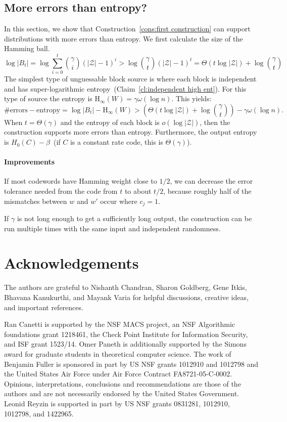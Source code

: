 \documentclass[11pt]{article}
\newcommand{\clref}[1]{\mbox{Claim~\ref{#1}}}
\newcommand{\consref}[1]{\mbox{Construction~\ref{#1}}}
\newcommand{\Hoo}{\mathrm{H}_\infty}
\newcommand{\blind}[1]{{#1}}
\newcommand{\blind}[1]{}
\begin{document}
\subsection{More errors than entropy?}
\label{sec:discussion}
In this section, we show that \consref{cons:first construction} can support distributions with more errors than entropy.
We first calculate the size of the Hamming ball.
\[
\log |B_t| = \log \sum_{i=0}^t {\gamma \choose i} (|\mathcal{Z}|-1)^i> \log {\gamma \choose t} (|\mathcal{Z}|-1)^t =\Theta(t\log |\mathcal{Z}|) + \log {\gamma\choose t}
\]
The simplest type of unguessable block source is where each block is independent and has super-logarithmic entropy~(\clref{cl:independent high ent}).  For this type of source the entropy is $\Hoo(W) = \gamma\omega(\log n)$.  This yields:
\[
\text{\# errors} - \text{entropy} = \log |B_t| -  \Hoo(W)  >\left( \Theta(t\log |\mathcal{Z}|) + \log {\gamma \choose t}\right) -  \gamma \omega(\log n) .
\]
When $t =\Theta(\gamma)$ and the entropy of each block is $o(\log |\mathcal{Z}|)$, then the construction supports more errors than entropy. Furthermore, the output entropy is $H_0(C) -\beta$~(if $C$ is a constant rate code, this is $\Theta(\gamma)$).

\paragraph{Improvements}  If most codewords have Hamming weight close to $1/2$, we can decrease the error tolerance needed from the code from $t$ to  about $t/2$, because roughly half of the mismatches between $w$ and $w'$ occur where $c_j =1$.

If $\gamma$ is not long enough to get a sufficiently long output, the construction can be run multiple times with the same input and independent randomness.

\blind{
\section*{Acknowledgements}
The authors are grateful to Nishanth Chandran, Sharon Goldberg, Gene Itkis, Bhavana Kanukurthi, and Mayank Varia for helpful discussions, creative ideas, and important references.

Ran Canetti is supported by the NSF MACS project, an NSF Algorithmic foundations grant 1218461, the Check Point Institute for Information Security, and  ISF grant 1523/14.
Omer Paneth is additionally supported by the Simons award for graduate students in theoretical computer science.
The work of Benjamin Fuller is sponsored in part by US NSF grants 1012910 and 1012798 and  the United States Air Force under Air Force Contract FA8721-05-C-0002. Opinions, interpretations, conclusions and recommendations are those of the authors and are not necessarily endorsed by the United States Government. 
Leonid Reyzin is supported in part by US NSF grants 0831281, 1012910, 1012798, and 1422965.
}


\end{document}
